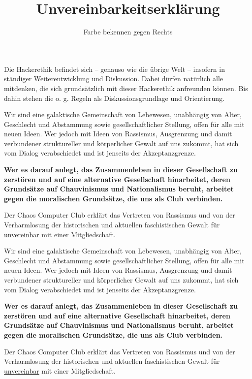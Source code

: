 \documentclass[a5paper]{scrartcl}
\begin{document}
Die Hackerethik befindet sich – genauso wie die übrige Welt – insofern in ständiger Weiterentwicklung und Diskussion. Dabei dürfen natürlich alle mitdenken, die sich grundsätzlich mit dieser Hackerethik anfreunden können. Bis dahin stehen die o. g. Regeln als Diskussionsgrundlage und Orientierung.


\title{\textbf{Unvereinbarkeitserklärung}}
\subtitle{Farbe bekennen gegen Rechts}

\newpage

\maketitle

Wir sind eine galaktische Gemeinschaft von Lebewesen, unabhängig von Alter, Geschlecht und Abstammung sowie gesellschaftlicher Stellung, offen für alle mit neuen Ideen. Wer jedoch mit Ideen von Rassismus, Ausgrenzung und damit verbundener struktureller und körperlicher Gewalt auf uns zukommt, hat sich vom Dialog verabschiedet und ist jenseits der Akzeptanzgrenze. 
\newline

\textbf{Wer es darauf anlegt, das Zusammenleben in dieser Gesellschaft zu zerstören und auf eine alternative Gesellschaft hinarbeitet, deren Grundsätze auf Chauvinismus und Nationalismus beruht, arbeitet gegen die moralischen Grundsätze, die uns als Club verbinden.\newline}

Der Chaos Computer Club erklärt das Vertreten von Rassismus und von der Verharmlosung der historischen und aktuellen faschistischen Gewalt für \underline{unvereinbar} mit einer Mitgliedschaft.

\newpage

\maketitle

Wir sind eine galaktische Gemeinschaft von Lebewesen, unabhängig von Alter, Geschlecht und Abstammung sowie gesellschaftlicher Stellung, offen für alle mit neuen Ideen. Wer jedoch mit Ideen von Rassismus, Ausgrenzung und damit verbundener struktureller und körperlicher Gewalt auf uns zukommt, hat sich vom Dialog verabschiedet und ist jenseits der Akzeptanzgrenze. 
\newline

\textbf{Wer es darauf anlegt, das Zusammenleben in dieser Gesellschaft zu zerstören und auf eine alternative Gesellschaft hinarbeitet, deren Grundsätze auf Chauvinismus und Nationalismus beruht, arbeitet gegen die moralischen Grundsätze, die uns als Club verbinden.\newline}

Der Chaos Computer Club erklärt das Vertreten von Rassismus und von der Verharmlosung der historischen und aktuellen faschistischen Gewalt für \underline{unvereinbar} mit einer Mitgliedschaft.
\end{document}
